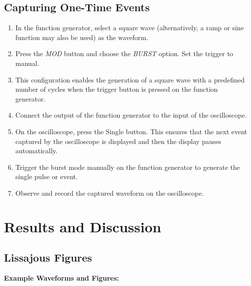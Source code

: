\documentclass[a4paper,12pt]{article}
\begin{document}
\subsection*{Capturing One-Time Events}
\begin{enumerate}
    \item In the function generator, select a square wave (alternatively, a ramp or sine function may also be used) as the waveform.
    \item Press the \textit{MOD} button and choose the \textit{BURST} option. Set the trigger to manual.
    \item This configuration enables the generation of a square wave with a predefined number of cycles when the trigger button is pressed on the function generator.
    \item Connect the output of the function generator to the input of the oscilloscope.
    \item On the oscilloscope, press the Single button. This ensures that the next event captured by the oscilloscope is displayed and then the display pauses automatically.
    \item Trigger the burst mode manually on the function generator to generate the single pulse or event.
    \item Observe and record the captured waveform on the oscilloscope.
\end{enumerate}
\section*{Results and Discussion}
\subsection*{Lissajous Figures}
\textbf{Example Waveforms and Figures:}
\end{document}
